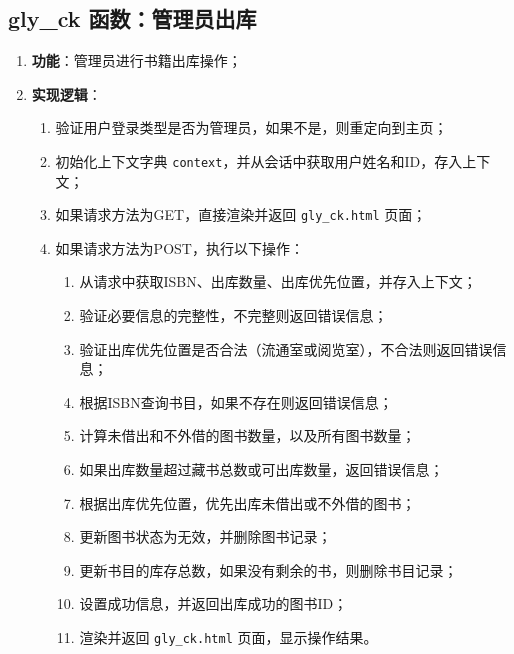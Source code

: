 \documentclass{ctexart}
\begin{document}
\subsection{gly\_ck 函数：管理员出库}
\begin{enumerate}
    \item \textbf{功能}：管理员进行书籍出库操作；
    \item \textbf{实现逻辑}：
    \begin{enumerate}
        \item 验证用户登录类型是否为管理员，如果不是，则重定向到主页；
        \item 初始化上下文字典 \texttt{context}，并从会话中获取用户姓名和ID，存入上下文；
        \item 如果请求方法为GET，直接渲染并返回 \texttt{gly\_ck.html} 页面；
        \item 如果请求方法为POST，执行以下操作：
        \begin{enumerate}
            \item 从请求中获取ISBN、出库数量、出库优先位置，并存入上下文；
            \item 验证必要信息的完整性，不完整则返回错误信息；
            \item 验证出库优先位置是否合法（流通室或阅览室），不合法则返回错误信息；
            \item 根据ISBN查询书目，如果不存在则返回错误信息；
            \item 计算未借出和不外借的图书数量，以及所有图书数量；
            \item 如果出库数量超过藏书总数或可出库数量，返回错误信息；
            \item 根据出库优先位置，优先出库未借出或不外借的图书；
            \item 更新图书状态为无效，并删除图书记录；
            \item 更新书目的库存总数，如果没有剩余的书，则删除书目记录；
            \item 设置成功信息，并返回出库成功的图书ID；
            \item 渲染并返回 \texttt{gly\_ck.html} 页面，显示操作结果。
        \end{enumerate}
    \end{enumerate}
\end{enumerate}
\end{document}
